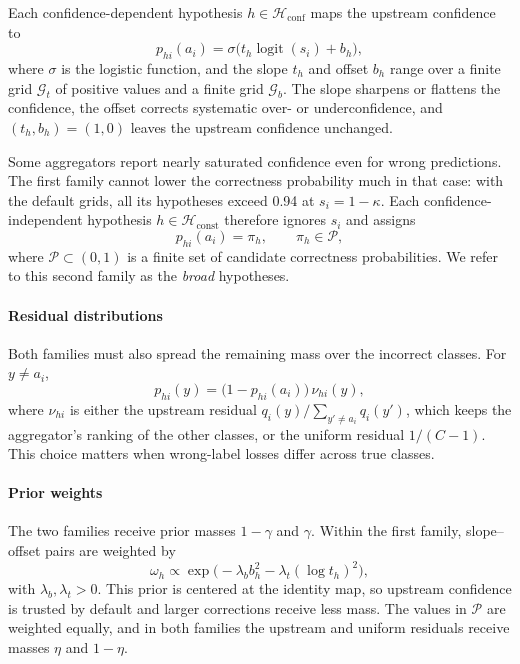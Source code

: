 \documentclass[journal]{IEEEtran}
\begin{document}
Each confidence-dependent hypothesis $h\in\mathcal{H}_{\mathrm{conf}}$ maps the upstream confidence to
\begin{equation}
    p_{hi}(a_i)
    =\sigma\bigl(t_h\operatorname{logit}(s_i)+b_h\bigr),
    \label{eq:calibrator}
\end{equation}
where $\sigma$ is the logistic function, and the slope $t_h$ and offset $b_h$ range over a finite grid $\mathcal{G}_t$ of positive values and a finite grid $\mathcal{G}_b$. The slope sharpens or flattens the confidence, the offset corrects systematic over- or underconfidence, and $(t_h,b_h)=(1,0)$ leaves the upstream confidence unchanged.

Some aggregators report nearly saturated confidence even for wrong predictions. The first family cannot lower the correctness probability much in that case: with the default grids, all its hypotheses exceed 0.94 at $s_i=1-\kappa$. Each confidence-independent hypothesis $h\in\mathcal{H}_{\mathrm{const}}$ therefore ignores $s_i$ and assigns
\begin{equation}
    p_{hi}(a_i)=\pi_h,\qquad
    \pi_h\in\mathcal{P},
    \label{eq:constant-calibrator}
\end{equation}
where $\mathcal{P}\subset(0,1)$ is a finite set of candidate correctness probabilities. We refer to this second family as the \emph{broad} hypotheses.

\paragraph{Residual distributions}
Both families must also spread the remaining mass over the incorrect classes. For $y\ne a_i$,
\begin{equation}
    p_{hi}(y)=\bigl(1-p_{hi}(a_i)\bigr)\,\nu_{hi}(y),
    \label{eq:residual}
\end{equation}
where $\nu_{hi}$ is either the upstream residual $q_i(y)/\sum_{y'\ne a_i}q_i(y')$, which keeps the aggregator's ranking of the other classes, or the uniform residual $1/(C-1)$. This choice matters when wrong-label losses differ across true classes.

\paragraph{Prior weights}
The two families receive prior masses $1-\gamma$ and $\gamma$. Within the first family, slope--offset pairs are weighted by
\begin{equation}
    \omega_h \propto
    \exp\bigl(
        -\lambda_b b_h^2
        -\lambda_t(\log t_h)^2
    \bigr),
    \label{eq:calibration-prior}
\end{equation}
with $\lambda_b,\lambda_t>0$. This prior is centered at the identity map, so upstream confidence is trusted by default and larger corrections receive less mass. The values in $\mathcal{P}$ are weighted equally, and in both families the upstream and uniform residuals receive masses $\eta$ and $1-\eta$.
\end{document}

